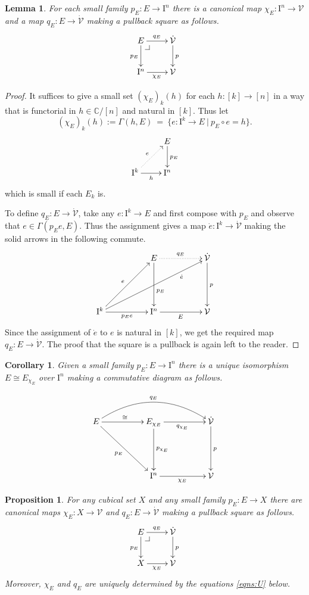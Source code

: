 \documentclass[12pt]{article}
\makeatletter
\newcommand{\C}{\ensuremath{\mathbb{C}}}
\newcommand{\pbcorner}[1][dr]{\save*!/#1-1.2pc/#1:(-1,1)@^{|-}\restore}
\newcommand{\ra}{\ensuremath{\rightarrow}}
\newcommand{\I}{\ensuremath{\mathrm{I}}}
\newcommand{\V}{\ensuremath{\mathcal{V}}}
\newcommand{\VV}{\ensuremath{\dot{\mathcal{V}}}}
\newtheorem{proposition}[theorem]{Proposition}
\newtheorem{lemma}[theorem]{Lemma}
\newtheorem{corollary}[theorem]{Corollary}
\theoremstyle{remark}
\theoremstyle{definition}
\makeatother
\begin{document}
\begin{lemma}\label{charforfamovercube}
For each small family $p_E : E \ra \I^n$ there is a canonical map $\chi_E : \I^n \ra \V$ and a map $q_E:E \ra\VV$ making a pullback square as follows.
\begin{equation}\label{diagram:U2}
\xymatrix{
E \ar[d]_{p_E} \ar[r]^{q_E}  \pbcorner& \VV\ar[d]^{p}  \\
\I^n \ar[r]_{\chi_E} & \V
}
\end{equation}
\end{lemma}
%
\begin{proof}
It suffices to give a small set $(\chi_E)_k(h)$ for each $h :[k] \ra [n]$ in a way that is functorial in $h \in \C/[n]$ and natural in $[k]$.  Thus let
\[
(\chi_E)_k(h) := \Gamma(h, E)\ = \ \{ e : \I^k \ra E \ |\ p_E\circ e = h \}.
\]
\[
\xymatrix{& E \ar[d]^{p_E} \\ \I^k \ar@{..>}[ru]^{e}\ar[r]_h & \I^n } 
\]
which is small if each $E_k$ is.  

To define $q_E:E \ra\VV$,  take any $e : \I^k \ra E$ and first compose with $p_E$ and observe that $e \in  \Gamma(p_Ee, E)$.  Thus the assignment gives a map $\dot{e} : \I^k \ra \VV$ making the solid arrows in the following commute.
\begin{equation}\label{diagram:U4}
\xymatrix@=5em{
&E \ar[d]^>>>>>>>{p_E} \ar@{..>}[r]^{q_E} & \VV\ar[d]^{p}  \\
\I^k \ar[r]_{p_Ee} \ar[ru]^{e}\ar[rru]_>>>>>>>>>>>{\dot{e}} & \I^n \ar[r]_{E} & \V
}
\end{equation}
Since the assignment of $\dot{e}$ to $e$ is natural in $[k]$, we get the required map $q_E : E\ra \VV$.
The proof that the square is a pullback is again left to the reader.
\end{proof}

\begin{corollary}
Given a small family $p_E : E \ra \I^n$ there is a unique isomorphism $E \cong E_{\chi_E}$ over $\I^n$ making a commutative diagram as follows.

\begin{equation}\label{diagram:U5}
\xymatrix@=5em{
E \ar[rd]_{p_E} \ar@/^2.0pc/[rr]^{q_E} \ar[r]^{\cong}  & E_{\chi_E} \ar[d]^{p_{\chi_E}} \ar[r]_{q_{\chi_E}} & \VV \ar[d]^{p}  \\
 &\I^n \ar[r]_{\chi_E} & \V
}
\end{equation}
\end{corollary}
%

\begin{proposition}\label{prop:familyclassifier}
For any cubical set $X$ and any small family $p_E : E \ra X$ there are canonical maps $\chi_E : X \ra \V$ and $q_E : E \ra\VV$ making a pullback square as follows.
\begin{equation}\label{diagram:U6}
\xymatrix{
E \ar[d]_{p_E} \ar[r]^{q_E}  \pbcorner & \VV\ar[d]^{p}  \\
X \ar[r]_{\chi_E} & \V
}
\end{equation}
Moreover, $\chi_E$ and $q_E$ are uniquely determined by the equations \eqref{eqns:U} below.
\end{proposition}
\end{document}
